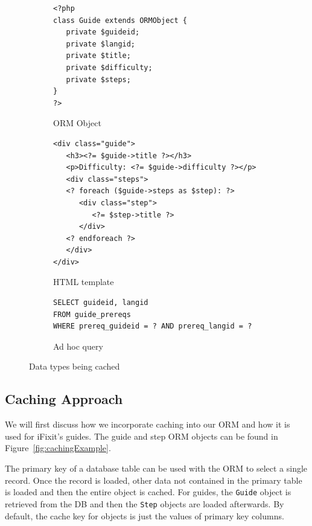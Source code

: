 \documentclass[12pt]{ucthesis}
\begin{document}
\begin{figure}[hbtp]
\begin{subfigure}[b]{1.0\textwidth}
\begin{ssp}
\begin{verbatim}
<?php
class Guide extends ORMObject {
   private $guideid;
   private $langid;
   private $title;
   private $difficulty;
   private $steps;
}
?>
\end{verbatim}
\end{ssp}
\caption{ORM Object}
\label{fig:ormObject}
\end{subfigure}

\begin{subfigure}[b]{1.0\textwidth}
\begin{ssp}
\begin{verbatim}
<div class="guide">
   <h3><?= $guide->title ?></h3>
   <p>Difficulty: <?= $guide->difficulty ?></p>
   <div class="steps">
   <? foreach ($guide->steps as $step): ?>
      <div class="step">
         <?= $step->title ?>
      </div>
   <? endforeach ?>
   </div>
</div>
\end{verbatim}
\end{ssp}
\caption{HTML template}
\label{fig:htmlTemplate}
\end{subfigure}

\begin{subfigure}[b]{1.0\textwidth}
\begin{ssp}
\begin{verbatim}
SELECT guideid, langid
FROM guide_prereqs
WHERE prereq_guideid = ? AND prereq_langid = ?
\end{verbatim}
\end{ssp}
\caption{Ad hoc query}
\label{fig:adHocQuery}
\end{subfigure}

\caption{Data types being cached}
\label{fig:dataBeingCached}
\end{figure}

\subsection{Caching Approach}
We will first discuss how we incorporate caching into our ORM and how it is used for \textsf{iFixit}'s guides.
The guide and step ORM objects can be found in Figure~\ref{fig:cachingExample}.

The primary key of a database table can be used with the ORM to select a single record.
Once the record is loaded, other data not contained in the primary table is loaded and then the entire object is cached.
For guides, the {\tt Guide} object is retrieved from the DB and then the {\tt Step} objects are loaded afterwards.
By default, the cache key for objects is just the values of primary key columns.
\end{document}
